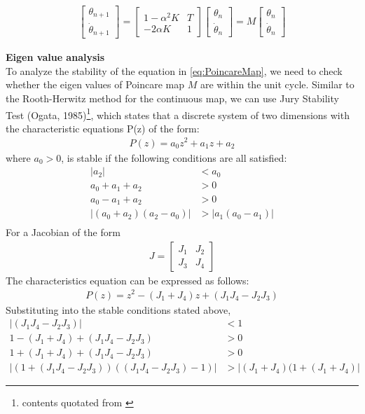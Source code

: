 \begin{align}
\label{eq:PoincareMap}
\begin{bmatrix}
\theta_{n+1}  \\
\dot \theta_{n+1}
\end{bmatrix} = \begin{bmatrix}
1-\alpha^2 K & T \\
-2\alpha K & 1
\end{bmatrix}\begin{bmatrix}
 \theta_n  \\
\dot \theta_n 
\end{bmatrix} = M
\begin{bmatrix}
 \theta_n  \\
\dot \theta_n 
\end{bmatrix}
\end{align}


\noindent \textbf{Eigen value analysis}\\
To analyze the stability of the equation in \ref{eq:PoincareMap}, we need to check whether the eigen values of Poincare map $M$ are within the unit cycle. Similar to the Rooth-Herwitz method for the continuous map, we can use Jury Stability Test (Ogata, 1985)\footnote{contents quotated from \cite{Cham2002}}, which states that a discrete system of two dimensions with the characteristic equations P(z) of the form:
\begin{align*}
P(z) = a_0z^2 + a_1z + a_2
\end{align*}
where $a_0>0$, is stable if the following conditions are all satisfied:
\begin{align*}
|a_2|&<a_0\\
a_0+a_1+a_2&>0\\
a_0-a_1+a_2&>0\\
|(a_0+a_2)(a_2-a_0)|&>|a_1(a_0-a_1)|\\
\end{align*}
For a Jacobian of the form 
\begin{align*}
J = \begin{bmatrix}
J_1 & J_2 \\
J_3 & J_4
\end{bmatrix}
\end{align*}
The characteristics equation can be expressed as follows:
\begin{align*}
P(z) = z^2-(J_1+J_4)z +(J_1J_4-J_2J_3)
\end{align*}
Substituting into the stable conditions stated above,
\begin{align}
\label{eq:condition1}
|(J_1J_4-J_2J_3)|&<1\\
\label{eq:condition2}
1-(J_1+J_4)+(J_1J_4-J_2J_3)&>0\\
\label{eq:condition3}
1+(J_1+J_4)+(J_1J_4-J_2J_3)&>0\\
\label{eq:condition4}
|(1+(J_1J_4-J_2J_3))((J_1J_4-J_2J_3)-1)|&>|(J_1+J_4)(1+(J_1+J_4)|
\end{align}

